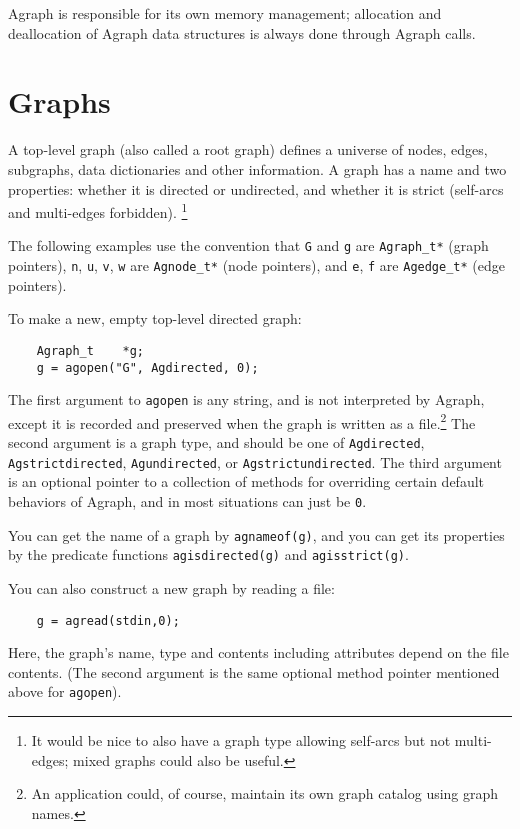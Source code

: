 \documentclass[11pt,letterpaper]{article}
\begin{document}
Agraph is responsible for its own memory management; allocation
and deallocation of Agraph data structures is always done through
Agraph calls.

\section{Graphs}
\label{sec:graphs}
A top-level graph (also called a root graph) defines a universe
of nodes, edges, subgraphs, data dictionaries and other information.
A graph has a name and two properties: whether it is directed or
undirected, and whether it is strict (self-arcs and multi-edges 
forbidden).  \footnote{It would be nice to also have a graph type allowing
self-arcs but not multi-edges; mixed graphs could also be useful.}

The following examples use the convention that \verb"G" and
\verb"g" are \verb"Agraph_t*" (graph pointers), \verb"n", \verb"u",
\verb"v", \verb"w" are \verb"Agnode_t*" (node pointers), and 
\verb"e", \verb"f" are \verb"Agedge_t*" (edge pointers).

To make a new, empty top-level directed graph:

\begin{verbatim}
    Agraph_t    *g;
    g = agopen("G", Agdirected, 0);
\end{verbatim}

The first argument to \verb"agopen" is any string, and is not
interpreted by Agraph, except it is recorded and preserved when
the graph is written as a file.\footnote{An application
could, of course, maintain its own graph catalog using graph names.} 
The second argument is a graph type, and should be one of
{\tt Agdirected}, {\tt Agstrictdirected}, {\tt Agundirected},
or {\tt Agstrictundirected}.
The third argument is an optional pointer to a collection of
methods for overriding certain default behaviors of Agraph,
and in most situations can just be {\tt 0}.

You can get the name of a graph by \verb"agnameof(g)", and
you can get its properties by the predicate functions
{\tt agisdirected(g)} and {\tt agisstrict(g)}.

You can also construct a new graph by reading a file:
\begin{verbatim}
    g = agread(stdin,0);
\end{verbatim}

Here, the graph's name, type and contents including attributes depend
on the file contents.  (The second argument is the same optional method
pointer mentioned above for \verb"agopen").
\end{document}

